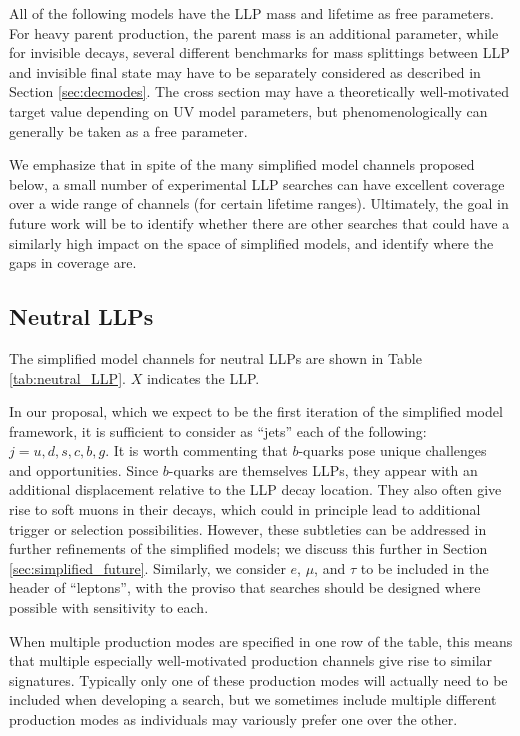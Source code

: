 All of the following models have the LLP mass and lifetime as free parameters. For heavy parent production, the parent mass is an additional parameter, while for invisible decays, several different benchmarks for mass splittings between LLP and invisible final state may have to be separately considered as described in Section \ref{sec:decmodes}. The cross section may have  a theoretically well-motivated target value depending on  UV model parameters, but phenomenologically can generally be taken as a free parameter.

We emphasize that in spite of the many simplified model
channels proposed below, a small number of experimental LLP searches can
have excellent coverage over a wide range of channels (for certain lifetime ranges). Ultimately, the goal in future work will be
to  identify whether there are other searches that could
have a similarly high impact on the space of simplified models, and  identify where the gaps in coverage are.

\subsection{Neutral LLPs}

The simplified model channels for neutral LLPs are shown in Table
\ref{tab:neutral_LLP}.  $X$ indicates the
LLP.

 
 In our proposal, which we expect to be the first iteration of the simplified
model framework, it is sufficient to consider as ``jets'' each of the
following:~$j=u,d,s,c,b,g$. It is worth commenting that $b$-quarks pose
unique challenges and opportunities. Since $b$-quarks are themselves
LLPs, they appear with an additional displacement relative to the LLP
decay location. They also often give rise to soft muons in their
decays, which could in principle lead to additional trigger or
selection possibilities.  However, these subtleties can be addressed
in further refinements of the simplified models; we discuss this further in Section
\ref{sec:simplified_future}. Similarly, we consider $e$,
$\mu$, and $\tau$ to be included in the header of ``leptons'', with the proviso that
searches should be designed where possible with sensitivity to each.
 
When multiple production modes are specified in one row of the table, this means that multiple
 especially well-motivated production channels give rise to similar
signatures. Typically only one of these production modes will actually need to
be included when developing a search, but we sometimes include multiple different production modes
as individuals may variously prefer one over the other. 


